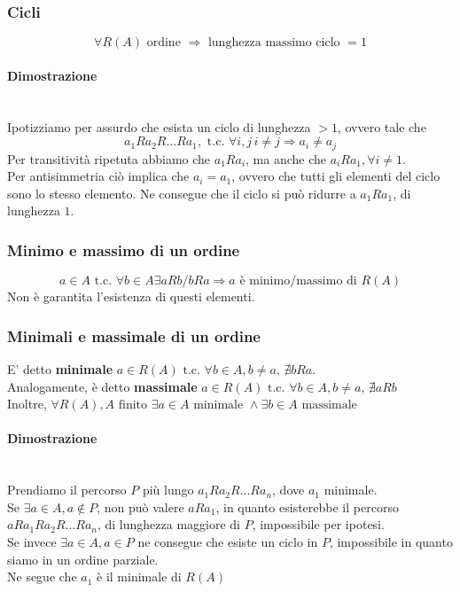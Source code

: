 \documentclass{report}
\newcommand{\subsubsubsection}[1]{\paragraph{#1}\mbox{}\\}
\begin{document}
        \subsubsection{Cicli}
           $$\forall R\left(A\right) \textrm{ ordine } \Longrightarrow \textrm{ lunghezza massimo ciclo } = 1$$
           \subsubsubsection{Dimostrazione}
                Ipotizziamo per assurdo che esista un ciclo di lunghezza $ > 1$, ovvero tale che 
                $$a_1Ra_2R...Ra_1, \textrm{ t.c. } \forall i, j \, i \neq j \Longrightarrow a_i \neq a_j$$
                Per transitività ripetuta abbiamo che $a_1Ra_i$, ma anche che $a_iRa_1,  \forall i \neq 1$. \\
                Per antisimmetria ciò implica che $a_i = a_1$, ovvero che tutti gli elementi del ciclo sono 
                lo stesso elemento. Ne consegue che il ciclo si può ridurre a $a_1Ra_1$, di lunghezza $1$.
        \subsubsection{Minimo e massimo di un ordine}
            $$a \in A \textrm{ t.c. } \forall b \in A \exists aRb / bRa \Longrightarrow a \textrm{ è minimo/massimo di } R\left(A\right)$$
            Non è garantita l'esistenza di questi elementi.
        \subsubsection{Minimali e massimale di un ordine}
            E' detto \textbf{minimale} $a \in R\left(A\right) \textrm{ t.c. } \forall b \in A, b \neq a, \, \nexists bRa$. \\
            Analogamente, è detto \textbf{massimale} $a \in R\left(A\right) \textrm{ t.c. } \forall b \in A, b \neq a, \, \nexists aRb$ \\
            Inoltre, $\forall R\left(A\right), A \textrm{ finito } \exists a \in A \textrm{ minimale } \wedge \exists b \in A \textrm{ massimale }$
            \subsubsubsection{Dimostrazione}
                Prendiamo il percorso $P$ più lungo $a_1Ra_2R...Ra_n$, dove $a_1$ minimale. \\ 
                Se $\exists a \in A, a \notin P$, non può valere $aRa_1$, in quanto esisterebbe 
                il percorso $aRa_1Ra_2R...Ra_n$, di lunghezza maggiore di $P$, impossibile per ipotesi. \\  
                Se invece $\exists a \in A, a \in P$ ne consegue che esiste un ciclo in $P$, impossibile 
                in quanto siamo in un ordine parziale. \\
                Ne segue che $a_1$ è il minimale di $R\left(A\right)$ 
\end{document}
